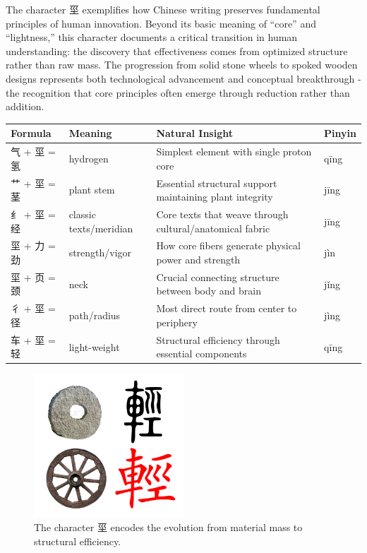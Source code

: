 \documentclass[11pt,letterpaper]{article}
\begin{document}
The character 坙 exemplifies how Chinese writing preserves fundamental
principles of human innovation. Beyond its basic meaning of ``core'' and
``lightness,'' this character documents a critical transition in human
understanding: the discovery that effectiveness comes from optimized
structure rather than raw mass. The progression from solid stone wheels
to spoked wooden designs represents both technological advancement and
conceptual breakthrough - the recognition that core principles often
emerge through reduction rather than addition.

\begin{longtable}{|p{3cm}|p{3cm}|p{6cm}|p{2cm}|}
\hline
\textbf{Formula} & \textbf{Meaning} & \textbf{Natural Insight} & \textbf{Pinyin} \\
\hline
气 + 坙 = 氢 & hydrogen & Simplest element with single proton core & qīng \\
\hline
艹 + 坙 = 茎 & plant stem & Essential structural support maintaining plant integrity & jīng \\
\hline
纟 + 坙 = 经 & classic texts/meridian & Core texts that weave through cultural/anatomical fabric & jīng \\
\hline
坙 + 力 = 劲 & strength/vigor & How core fibers generate physical power and strength & jìn \\
\hline
坙 + 页 = 颈 & neck & Crucial connecting structure between body and brain & jǐng \\
\hline
彳 + 坙 = 径 & path/radius & Most direct route from center to periphery & jìng \\
\hline
车 + 坙 = 轻 & light-weight & Structural efficiency through essential components & qīng \\
\hline
\end{longtable}

\begin{figure}
\centering
\includegraphics[width=0.5\textwidth]{./images/zi_stem.png}
\caption{The character 坙 encodes the evolution from material mass to
structural efficiency.}
\end{figure}
\end{document}
